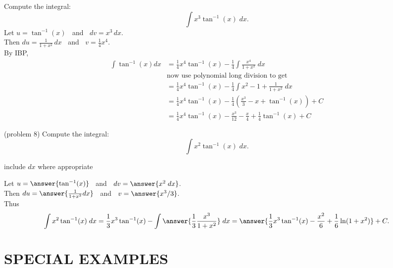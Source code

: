 \documentclass{ximera}
\begin{document}
\begin{example}[example 8]
Compute the integral:
  \[
  \int x^3\tan^{-1}(x) \;dx.
  \]
Let $u = \tan^{-1}(x)\;\;$   and   $\;\;dv = x^3 \, dx$.\\
  Then $du = \frac{1}{1+x^2}\, dx\;\;$   and   $\;\;v = \frac14 x^4$.\\
By IBP,
  \begin{align*}
  \int  \tan^{-1}(x) dx &= \frac14 x^4\tan^{-1}(x) - \frac14\int \frac{x^4}{1+x^2} \;dx\\
  & \text{now use polynomial long division to get} \\
  &= \frac14 x^4\tan^{-1}(x) - \frac14 \int x^2 - 1 + \frac{1}{1+x^2} \; dx\\
  &= \frac14 x^4\tan^{-1}(x) - \frac14\left(\frac{x^3}{3} - x + \tan^{-1}(x)\right) + C\\
  &= \frac14 x^4\tan^{-1}(x) - \frac{x^3}{12} - \frac{x}{4} + \frac14 \tan^{-1}(x) + C
  \end{align*}
  
\end{example}

\begin{problem}(problem 8)
Compute the integral:
  \[
  \int x^2\tan^{-1}(x) \;dx.
  \]
\begin{hint}
      include $dx$ where appropriate
  \end{hint}
  Let $u = \answer{\tan^{-1}(x)}\;\;$   and   $\;\;dv = \answer{x^2 \;dx}$.\\
  Then $du = \answer{\frac{1}{1+x^2} dx}\;\;$   and   $\;\;v = \answer{x^3/3}$.\\
  Thus 
  \[
  \int x^2 \tan^{-1}(x) \; dx = \frac13 x^3 \tan^{-1}(x) - \int \answer{\frac13 \frac{x^3}{1+x^2}} \;dx = 
  \answer{\frac13 x^3 \tan^{-1}(x) - \frac{x^2}{6} + \frac16\ln(1+x^2)} + C.
  \]
\end{problem}

\section{SPECIAL EXAMPLES}
\end{document}
